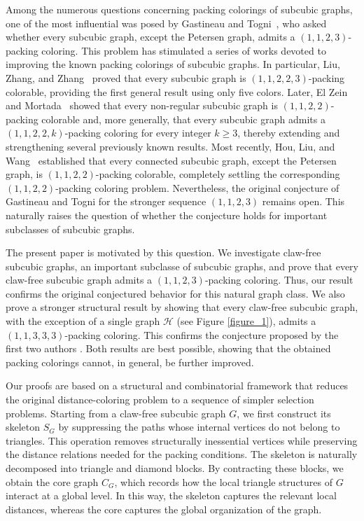 \documentclass[12pt, oneside]{scrartcl}
\begin{document}
Among the numerous questions concerning packing colorings of subcubic graphs, one of the most influential was posed by Gastineau and Togni~\cite{16}, who asked whether every subcubic graph, except the Petersen graph, admits a $(1,1,2,3)$-packing coloring. This problem has stimulated a series of works devoted to improving the known packing colorings of subcubic graphs. In particular, Liu, Zhang, and Zhang~\cite{LZZ24} proved that every subcubic graph is $(1,1,2,2,3)$-packing colorable, providing the first general result using only five colors. Later, El Zein and Mortada~\cite{AM1} showed that every non-regular subcubic graph is $(1,1,2,2)$-packing colorable and, more generally, that every subcubic graph admits a $(1,1,2,2,k)$-packing coloring for every integer $k\geq3$, thereby extending and strengthening several previously known results. Most recently, Hou, Liu, and Wang~\cite{HLW} established that every connected subcubic graph, except the Petersen graph, is $(1,1,2,2)$-packing colorable, completely settling the corresponding $(1,1,2,2)$-packing coloring problem. Nevertheless, the original conjecture of Gastineau and Togni for the stronger sequence $(1,1,2,3)$ remains open. This naturally raises the question of whether the conjecture holds for important subclasses of subcubic graphs.

The present paper is motivated by this question. We investigate claw-free subcubic graphs, an important subclasse of subcubic graphs, and prove that every claw-free subcubic graph admits a $(1,1,2,3)$-packing coloring. Thus, our result confirms the original conjectured behavior for this natural graph class. We also prove a stronger structural result by showing that every claw-free subcubic graph, with the exception of a single graph $\mathcal{H}$ (see Figure \ref{figure_1}), admits a $(1,1,3,3,3)$-packing coloring. This confirms the conjecture proposed by the first two authors \cite{AM4}. Both results are best possible, showing that the obtained packing colorings cannot, in general, be further improved.

Our proofs are based on a structural and combinatorial framework that reduces the original distance-coloring problem to a sequence of simpler selection problems. Starting from a claw-free subcubic graph $G$, we first construct its skeleton $S_G$ by suppressing the paths whose internal vertices do not belong to triangles. This operation removes structurally inessential vertices while preserving the distance relations needed for the packing conditions. The skeleton is naturally decomposed into triangle and diamond blocks. By contracting these blocks, we obtain the core graph $C_G$, which records how the local triangle structures of $G$ interact at a global level. In this way, the skeleton captures the relevant local distances, whereas the core captures the global organization of the graph.
\end{document}
